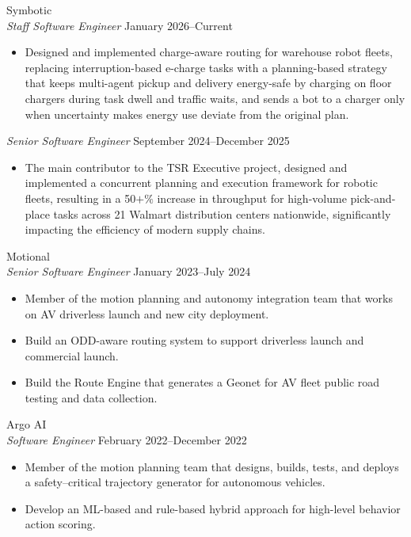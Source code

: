 \documentclass[margin, 10pt]{res} %
\begin{document}
\begin{resume}
{\sc Symbotic}\\
{\sl Staff Software Engineer} \hfill January 2026--Current
\begin{itemize}\sloppy
	\item Designed and implemented charge-aware routing for warehouse robot fleets, replacing interruption-based e-charge tasks with a planning-based strategy that keeps multi-agent pickup and delivery energy-safe by charging on floor chargers during task dwell and traffic waits, and sends a bot to a charger only when uncertainty makes energy use deviate from the original plan.
\end{itemize}
{\sl Senior Software Engineer} \hfill September 2024--December 2025
\begin{itemize}\sloppy
    \item The main contributor to the TSR Executive project, designed and implemented a concurrent planning and execution framework for robotic fleets, resulting in a 50$+\%$ increase in throughput for high-volume pick-and-place tasks across 21 Walmart distribution centers nationwide, significantly impacting the efficiency of modern supply chains.
\end{itemize}

{\sc Motional}\\
{\sl Senior Software Engineer} \hfill January 2023--July 2024
\begin{itemize}
	\item Member of the motion planning and autonomy integration team that works on AV driverless launch and new city deployment.
    \item Build an ODD-aware routing system to support driverless launch and commercial launch. 
    \item Build the Route Engine that generates a Geonet for AV fleet public road testing and data collection.  
\end{itemize}

{\sc Argo AI}\\
{\sl Software Engineer \MakeUppercase{}} \hfill February 2022--December 2022
\begin{itemize}
	\item Member of the motion planning team that designs, builds, tests, and deploys a safety--critical trajectory generator for autonomous vehicles. 
        \item Develop an ML-based and rule-based hybrid approach for high-level behavior action scoring.
\end{itemize}


\end{resume}
\end{document}
